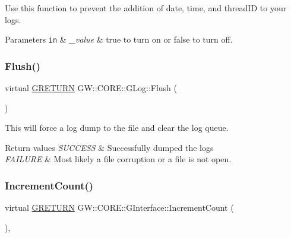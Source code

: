 Use this function to prevent the addition of date, time, and thread\+ID to your logs.


\begin{DoxyParams}[1]{Parameters}
\mbox{\tt in}  & {\em \+\_\+value} & true to turn on or false to turn off. \\
\hline
\end{DoxyParams}
\hypertarget{class_g_w_1_1_c_o_r_e_1_1_g_log_a1e0bb42d95ddd42fa019d5cd6050ff97}{}\label{class_g_w_1_1_c_o_r_e_1_1_g_log_a1e0bb42d95ddd42fa019d5cd6050ff97} 
\subsubsection{\texorpdfstring{Flush()}{Flush()}}
{\footnotesize\ttfamily virtual \hyperlink{namespace_g_w_a69b1aaebac1cac8049825f035884c95b}{G\+R\+E\+T\+U\+RN} G\+W\+::\+C\+O\+R\+E\+::\+G\+Log\+::\+Flush (\begin{DoxyParamCaption}{ }\end{DoxyParamCaption})\hspace{0.3cm}{\ttfamily [pure virtual]}}

This will force a log dump to the file and clear the log queue.


\begin{DoxyRetVals}{Return values}
{\em S\+U\+C\+C\+E\+SS} & Successfully dumped the logs \\
\hline
{\em F\+A\+I\+L\+U\+RE} & Most likely a file corruption or a file is not open. \\
\hline
\end{DoxyRetVals}
\hypertarget{class_g_w_1_1_c_o_r_e_1_1_g_interface_a3e04e58eef4f3e3f56ff7fb751194c37}{}\label{class_g_w_1_1_c_o_r_e_1_1_g_interface_a3e04e58eef4f3e3f56ff7fb751194c37} 
\subsubsection{\texorpdfstring{Increment\+Count()}{IncrementCount()}}
{\footnotesize\ttfamily virtual \hyperlink{namespace_g_w_a69b1aaebac1cac8049825f035884c95b}{G\+R\+E\+T\+U\+RN} G\+W\+::\+C\+O\+R\+E\+::\+G\+Interface\+::\+Increment\+Count (\begin{DoxyParamCaption}{ }\end{DoxyParamCaption})\hspace{0.3cm}{\ttfamily [pure virtual]}, {\ttfamily [inherited]}}

